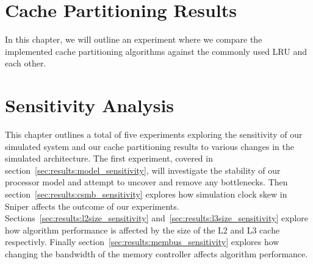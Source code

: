 \chapter{Cache Partitioning Results}
\label{cpt:results}
In this chapter, we will outline an experiment where we compare the implemented cache partitioning algorithms against the commonly used LRU and each other.




\chapter{Sensitivity Analysis}
\label{cpt:sresults}
This chapter outlines a total of five experiments exploring the sensitivity of our simulated system and our cache partitioning results to various changes in the simulated architecture.
The first experiment, covered in section~\ref{sec:results:model_sensitivity}, will investigate the stability of our processor model and attempt to uncover and remove any bottlenecks.
Then section~\ref{sec:results:csmb_sensitivity} explores how simulation clock skew in Sniper affects the outcome of our experiments.
Sections~\ref{sec:results:l2size_sensitivity} and~\ref{sec:results:l3size_sensitivity} explore how algorithm performance is affected by the size of the L2 and L3 cache respectivly.
Finally section~\ref{sec:results:membus_sensitivity} explores how changing the bandwidth of the memory controller affects algorithm performance.










